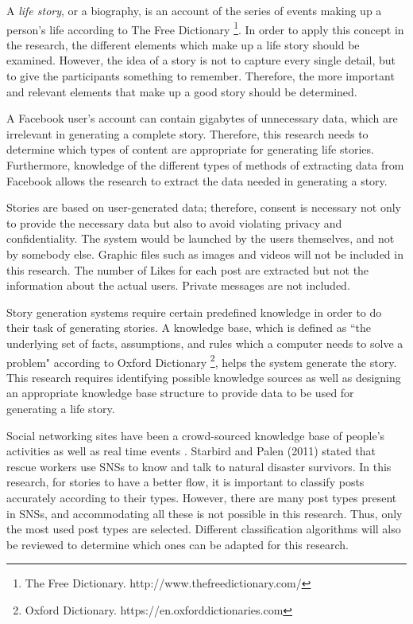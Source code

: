 A \textit{life story}, or a biography, is an account of the series of events making up a person's life according to The Free Dictionary \footnote{The Free Dictionary. http://www.thefreedictionary.com/}. In order to apply this concept in the research, the different elements which make up a life story should be examined. However, the idea of a story is not to capture every single detail, but to give the participants something to remember. Therefore, the more important and relevant elements that make up a good story should be determined.

A Facebook user's account can contain gigabytes of unnecessary data, which are irrelevant in generating a complete story. Therefore, this research needs to determine which types of content are appropriate for generating life stories. Furthermore, knowledge of the different types of methods of extracting data from Facebook allows the research to extract the data needed in generating a story.

Stories are based on user-generated data; therefore, consent is necessary not only to provide the necessary data but also to avoid violating privacy and confidentiality. The system would be launched by the users themselves, and not by somebody else. Graphic files such as images and videos will not be included in this research. The number of Likes for each post are extracted but not the information about the actual users. Private messages are not included. 

Story generation systems require certain predefined knowledge in order to do their task of generating stories. A knowledge base, which is defined as ``the underlying set of facts, assumptions, and rules which a computer needs to solve a problem" according to Oxford Dictionary \footnote{Oxford Dictionary. https://en.oxforddictionaries.com}, helps the system generate the story. This research requires identifying possible knowledge sources as well as designing an appropriate knowledge base structure to provide data to be used for generating a life story.

Social networking sites have been a crowd-sourced knowledge base of people's activities as well as real time events \cite{Jain2016TowardsAE}. Starbird and Palen (2011) stated that rescue workers use SNSs to know and talk to natural disaster survivors. In this research, for stories to have a better flow, it is important to classify posts accurately according to their types. However, there are many post types present in SNSs, and accommodating all these is not possible in this research. Thus, only the most used post types are selected. Different classification algorithms will also be reviewed to determine which ones can be adapted for this research.

